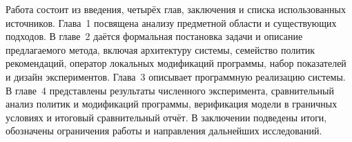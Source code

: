 Работа состоит из введения, четырёх глав, заключения и списка использованных источников. Глава~1 посвящена анализу предметной области и существующих подходов. В главе~2 даётся формальная постановка задачи и описание предлагаемого метода, включая архитектуру системы, семейство политик рекомендаций, оператор локальных модификаций программы, набор показателей и дизайн экспериментов. Глава~3 описывает программную реализацию системы. В главе~4 представлены результаты численного эксперимента, сравнительный анализ политик и модификаций программы, верификация модели в граничных условиях и итоговый сравнительный отчёт. В заключении подведены итоги, обозначены ограничения работы и направления дальнейших исследований.
